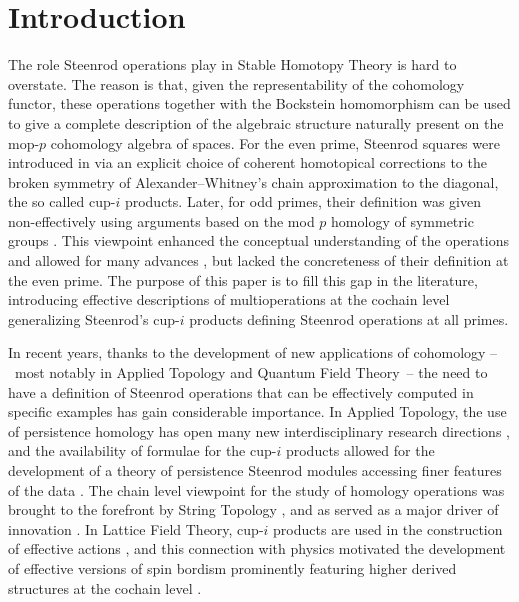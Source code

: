 
\section{Introduction} \label{s:introduction}

The role Steenrod operations play in Stable Homotopy Theory is hard to overstate.
The reason is that, given the representability of the cohomology functor, these operations together with the Bockstein homomorphism can be used to give a complete description of the algebraic structure naturally present on the mop-$p$ \mbox{cohomology} algebra of spaces.
For the even prime, Steenrod squares were introduced in \cite{steenrod47products} via an explicit choice of coherent homotopical corrections to the broken symmetry of Alexander--Whitney's chain approximation to the diagonal, the so called cup-$i$ products.
Later, for odd primes, their definition was given non-effectively using arguments based on the mod $p$ homology of symmetric groups \cites{steenrod53symmetric, steenrod53cyclic, steenrod62operations}.
This viewpoint enhanced the conceptual understanding of the operations and allowed for many advances \cites{adem1952iteration, milnor1958dual, adams1995stable}, but lacked the concreteness of their definition at the even prime.
The purpose of this paper is to fill this gap in the literature, introducing effective descriptions of multioperations at the cochain level generalizing Steenrod's cup-$i$ products defining Steenrod operations at all primes.

In recent years, thanks to the development of new applications of cohomology --~most notably in Applied Topology and Quantum Field Theory~-- the need to have a definition of Steenrod operations that can be effectively computed in specific examples has gain considerable importance.
In Applied Topology, the use of persistence homology \cites{carlsson2009data, edelsbrunner2008persistent} has open many new interdisciplinary research directions \cites{de2007coverage, chan2013topology, lee2017quantifying}, and the availability of formulae for the cup-$i$ products allowed for the development of a theory of persistence Steenrod modules accessing finer features of the data \cite{medina2018persistence}.
The chain level viewpoint for the study of homology operations was brought to the forefront by String Topology \cite{Sullivanoverview}, and as served as a major driver of innovation \cites{TZ, hoch2}.
In Lattice Field Theory, cup-$i$ products are used in the construction of effective actions \cite{gaiotto2016spin, bhardwaj2017state, kapustin2017fermionic}, and this connection with physics motivated the development of effective versions of spin bordism \cites{brumfiel2016pontrjagin, brumfiel2018pontrjagin} prominently featuring higher derived structures at the cochain level \cite{medina2020cartan, medina2020adem}.

